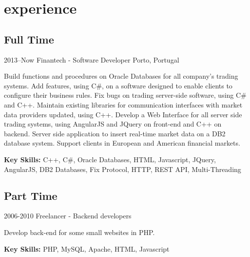 \documentclass[]{friggeri-cv} %
\begin{document}

\section{experience}

\subsection{Full Time}

\begin{entrylist}


\entry
{2013--Now}
{Finantech - Software Developer}
{Porto, Portugal}
{
Build functions and procedures on Oracle Databases for all company's trading systems. Add features, using C\#, on a software designed to enable clients to configure their business rules. Fix bugs on trading server-side software, using C\# and C++. Maintain existing libraries for communication interfaces with market data providers updated, using C++. Develop a Web Interface for all server side trading systems, using AngularJS and JQuery on front-end and C++ on backend. Server side application to insert real-time market data on a DB2 database system. Support clients in European and American financial markets. 

\textbf{Key Skills: }
C++, C\#, Oracle Databases, HTML, Javascript, JQuery, AngularJS, DB2 Databases, Fix Protocol, HTTP, REST API, Multi-Threading
}


\end{entrylist}

\subsection{Part Time}

\begin{entrylist}

\entry
{2006-2010}
{Freelancer - Backend developers}
{}
{
Develop back-end for some small websites in PHP.  

\textbf{Key Skills: }
PHP, MySQL, Apache, HTML, Javascript
}

\end{entrylist}
\end{document}
